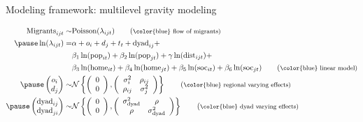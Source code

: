 \documentclass{beamer}
\begin{document}
\begin{frame}[fragile]{Modeling framework: multilevel gravity modeling}
\begin{small}
  \begin{align}
  	\text{Migrants}_{ijt} \sim & \text{Poisson}(\lambda_{ijt})\tag{\footnotesize \color{blue} flow of migrants}\\ \pause
  	\ln(\lambda_{ijt}) = & \alpha +   o_i + d_j + t_t + \text{dyad}_{ij}+ \notag \\
  	& \beta_1 \ln(\text{pop}_{it}) + \beta_2
  	\ln(\text{pop}_{jt}) +
  	\gamma \ln(\text{dist}_{ijt}) + \notag \\
  	& \beta_3 \ln(\text{home}_{it}) +
  	\beta_4 \ln(\text{home}_{jt}) +
  	\beta_5 \ln(\text{soc}_{it}) + \beta_6
  	\ln(\text{soc}_{jt})  \tag{\footnotesize \color{blue} linear model} \\ \pause
	\begin{pmatrix}o_i\\
	d_j
\end{pmatrix} \sim &\mathcal{N} \left\{\left(\begin{array}{c}
	0\\
	0
\end{array}\right),
\left(                                        
\begin{array}{cc}
	\sigma^2_i & \rho_{ij} \\
	\rho_{ij} & \sigma^2_{j} 
\end{array}
\right)
\right\} \tag{\footnotesize \color{blue} regional varying effects} \\ \pause
	\begin{pmatrix}\text{dyad}_{ij}\\
	\text{dyad}_{ji}
\end{pmatrix} \sim & \mathcal{N} \left\{\left(\begin{array}{c}
	0\\
	0
\end{array}\right),
\left(                                        
\begin{array}{cc}
	\sigma^2_{\text{dyad}} & \rho \\
	\rho & \sigma^2_{\text{dyad}} 
\end{array}
\right)
\right\} \tag{\footnotesize \color{blue} dyad varying effects} 
\end{align}
\end{small}
\end{frame}
\end{document}
